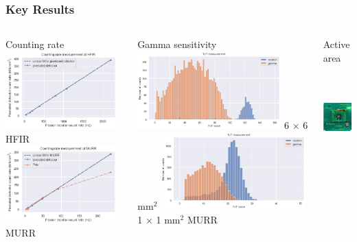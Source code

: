\documentclass[xcolor=x11names, compress, handout]{beamer}
\renewcommand{\(}{\begin{columns}}
\renewcommand{\)}{\end{columns}}
\newcommand{\<}[1]{\begin{column}{#1}}
\renewcommand{\>}{\end{column}}
\begin{document}
\begin{frame}
  \frametitle{Key Results}
  \begin{center}
  \begin{columns}
  \begin{column}{0.33\textwidth}
  Counting rate
  \centering
  \includegraphics[width=\textwidth, height=3cm]{images/counting_rate_HFIR.png}
  \scriptsize HFIR
  \includegraphics[width=\textwidth, height=3cm]{images/counting_rate_MURR.png}
  MURR
  \end{column}
  \begin{column}{0.33\textwidth}
  Gamma sensitivity
  \centering
  \includegraphics[width=\textwidth, height=3cm]{images/roughness3.png}
  \scriptsize 6 $\times$ 6 mm$^2$ 
  \includegraphics[width=\textwidth, height=3cm]{images/spectra3.png}
  1 $\times$ 1 mm$^2$
  MURR
  \end{column}
  \begin{column}{0.3\textwidth}
  \centering
  Active area \\
  \
  \includegraphics[width=\textwidth, height=3cm]{images/signal_processing_board.PNG}

\end{column}
\end{columns}
\end{center}
\end{frame}
\end{document}
